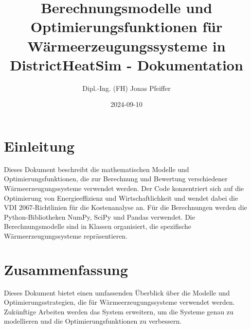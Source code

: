 \documentclass{article}
\title{Berechnungsmodelle und Optimierungsfunktionen für Wärmeerzeugungssysteme in DistrictHeatSim - Dokumentation}
\author{Dipl.-Ing. (FH) Jonas Pfeiffer}
\date{2024-09-10}
\begin{document}
\maketitle

\tableofcontents

\section{Einleitung}
Dieses Dokument beschreibt die mathematischen Modelle und Optimierungsfunktionen, die zur Berechnung und Bewertung verschiedener Wärmeerzeugungssysteme verwendet werden. Der Code konzentriert sich auf die Optimierung von Energieeffizienz und Wirtschaftlichkeit und wendet dabei die VDI 2067-Richtlinien für die Kostenanalyse an. Für die Berechnungen werden die Python-Bibliotheken NumPy, SciPy und Pandas verwendet. Die Berechnungsmodelle sind in Klassen organisiert, die spezifische Wärmeerzeugungssysteme repräsentieren.
















\section{Zusammenfassung}
Dieses Dokument bietet einen umfassenden Überblick über die Modelle und Optimierungsstrategien, die für Wärmeerzeugungssysteme verwendet werden. Zukünftige Arbeiten werden das System erweitern, um die Systeme genau zu modellieren und die Optimierungsfunktionen zu verbessern.
\end{document}
